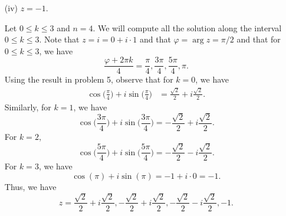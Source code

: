 \documentclass[a4paper]{article}
\begin{document}
\begin{enumerate}
\begin{solution}
                \end{solution}
            \item[(iv)] \( z = -1  \).
                \begin{solution}
                Let \( 0 \leq k \leq 3   \) and \( n = 4  \). We will compute all the solution along the interval \( 0 \leq k \leq 3   \). Note that \( z = i = 0 + i \cdot 1 \) and that \( \varphi =  \arg z = \pi / 2  \) and that for \( 0 \leq k \leq 3 \), we have   
                \[  \frac{  \varphi + 2 \pi k   }{ 4   } = \frac{ \pi  }{ 4 }, \frac{ 3 \pi  }{ 4  },  \frac{  5 \pi  }{ 4 }, \pi.       \]
                Using the result in problem 5, observe that for \( k = 0  \), we have 
                \begin{align*}
                   \cos \Big(  \frac{  \pi  }{ 4  }   \Big)  + i \sin \Big(  \frac{ \pi  }{ 4  }  \Big) &= \frac{ \sqrt{ 2 }  }{ 2 }  + i \frac{ \sqrt{ 2 }  }{ 2 }.
                \end{align*}
                Similarly, for \( k = 1  \), we have 
                \[  \cos \Big(  \frac{ 3 \pi  }{ 4  }  \Big) + i \sin \Big(  \frac{ 3 \pi  }{  4  }  \Big) = - \frac{ \sqrt{ 2 }  }{ 2 }  + i \frac{ \sqrt{ 2 }  }{ 2 }. \]
                For \( k = 2  \), 
                \[  \cos \Big(  \frac{ 5 \pi  }{  4  }  \Big) + i \sin \Big(  \frac{ 5 \pi  }{  4  }  \Big) = - \frac{ \sqrt{ 2 }  }{ 2 }  - i \frac{ \sqrt{ 2 }  }{ 2 }. \]
                For \( k = 3  \), we have 
                \[  \cos (\pi)  + i \sin (\pi) = -1 + i \cdot 0 = -1. \]
                Thus, we have 
                \[  z = \frac{ \sqrt{ 2 }  }{ 2 }  + i \frac{ \sqrt{ 2 }  }{ 2 },  - \frac{ \sqrt{ 2 }  }{ 2 }  + i \frac{ \sqrt{ 2 }  }{ 2 }, - \frac{ \sqrt{ 2 }  }{ 2 }  - i \frac{ \sqrt{ 2 }  }{ 2 }, -1. \]

                \end{solution}
        \end{enumerate}
\end{document}

